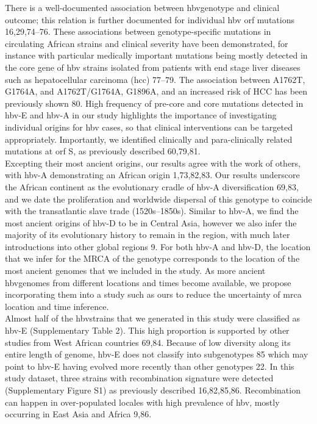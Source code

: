 There is a well-documented association between \gls{hbv}genotype and clinical outcome; this relation is further documented for individual \gls{hbv} \gls{orf} mutations 16,29,74–76. These associations between genotype-specific mutations in circulating African strains and clinical severity have been demonstrated, for instance with particular medically important mutations being mostly detected in the core gene of \gls{hbv} strains isolated from patients with end stage liver diseases such as hepatocellular carcinoma (\gls{hcc}) 77–79. The association between A1762T, G1764A, and A1762T/G1764A, G1896A, and an increased risk of HCC has been previously shown 80. High frequency of pre-core and core mutations detected in \gls{hbv}-E and \gls{hbv}-A in our study highlights the importance of investigating individual origins for \gls{hbv} cases, so that clinical interventions can be targeted appropriately. Importantly, we identified clinically and para-clinically related mutations at \gls{orf} S, as previously described 60,79,81.\\

Excepting their most ancient origins, our results agree with the work of others, with \gls{hbv}-A demonstrating an African origin 1,73,82,83. Our results underscore the African continent as the evolutionary cradle of \gls{hbv}-A diversification 69,83, and we date the proliferation and worldwide dispersal of this genotype to coincide with the transatlantic slave trade (1520s--1850s). Similar to \gls{hbv}-A, we find the most ancient origins of \gls{hbv}-D to be in Central Asia, however we also infer the majority of its evolutionary history to remain in the region, with much later introductions into other global regions 9. For both \gls{hbv}-A and \gls{hbv}-D, the location that we infer for the MRCA of the genotype corresponds to the location of the most ancient genomes that we included in the study. As more ancient \gls{hbv}genomes from different locations and times become available, we propose incorporating them into a study such as ours to reduce the uncertainty of \gls{mrca} location and time inference.\\

Almost half of the \gls{hbv}strains that we generated in this study were classified as \gls{hbv}-E (Supplementary Table 2). This high proportion is supported by other studies from West African countries 69,84. Because of low diversity along its entire length of genome, \gls{hbv}-E does not classify into subgenotypes 85 which may point to \gls{hbv}-E having evolved more recently than other genotypes 22. In this study dataset, three strains with recombination signature were detected (Supplementary Figure S1) as previously described 16,82,85,86. Recombination can happen in over-populated locales with high prevalence of \gls{hbv}, mostly occurring in East Asia and Africa 9,86.\\

